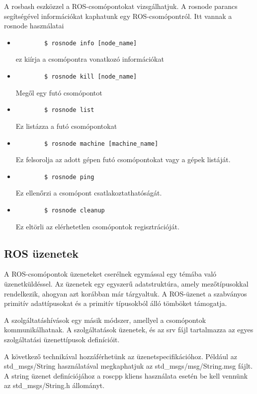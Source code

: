 \documentclass{article}
\begin{document}
A rosbash eszközzel a ROS-csomópontokat vizsgálhatjuk. A rosnode parancs segítségével információkat kaphatunk egy ROS-csomópontról. Itt vannak a rosnode használatai
\begin{itemize}
    \item
    \begin{verbatim}
        $ rosnode info [node_name]
    \end{verbatim}ez kiírja a csomópontra vonatkozó információkat
    \item
    \begin{verbatim}
        $ rosnode kill [node_name]
    \end{verbatim}Megől egy futó csomópontot
    \item
    \begin{verbatim}
        $ rosnode list
    \end{verbatim}Ez listázza a futó csomópontokat
    \item
    \begin{verbatim}
        $ rosnode machine [machine_name]
    \end{verbatim}Ez felsorolja az adott gépen futó csomópontokat vagy a gépek listáját.
    \item
    \begin{verbatim}
        $ rosnode ping
    \end{verbatim} Ez ellenőrzi a csomópont csatlakoztathatóságát.
    \item
    \begin{verbatim}
        $ rosnode cleanup
    \end{verbatim}Ez eltörli az elérhetetlen csomópontok regisztrációját.
\end{itemize}



\subsection{ROS üzenetek}
A ROS-csomópontok üzeneteket cserélnek egymással egy témába való üzenetküldéssel. Az üzenetek egy egyszerű adatstruktúra, amely mezőtípusokkal rendelkezik, ahogyan azt korábban már tárgyaltuk. A ROS-üzenet a szabványos primitív adattípusokat és a primitív típusokból álló tömböket támogatja.

A szolgáltatáshívások egy másik módszer, amellyel a csomópontok kommunikálhatnak. A szolgáltatások üzenetek, és az srv fájl tartalmazza az egyes szolgáltatási üzenettípusok definícióit.

A következő technikával hozzáférhetünk az üzenetspecifikációhoz. Például az std\_msgs/String használatával megkaphatjuk az std\_msgs/msg/String.msg fájlt. A string üzenet definíciójához a roscpp kliens használata esetén be kell vennünk az std\_msgs/String.h állományt.
\end{document}

